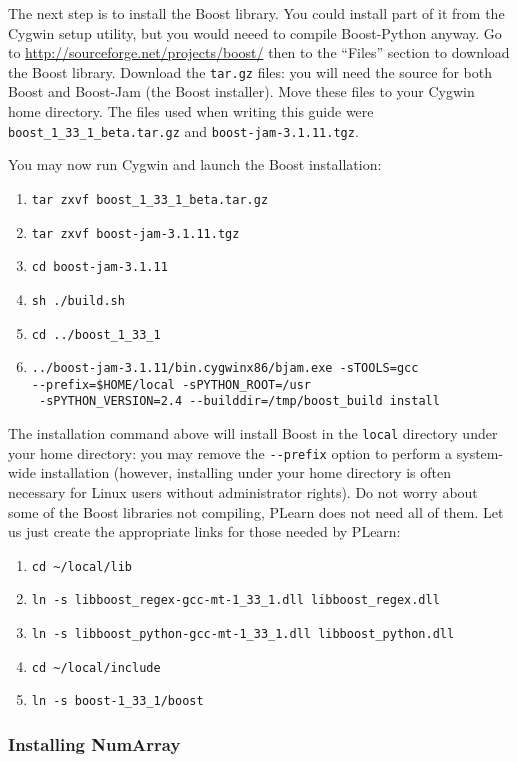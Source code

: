 \documentclass[11pt]{book}
\begin{document}
The next step is to install the Boost library.
You could install part of it from the Cygwin setup utility, but you would
neeed to compile Boost-Python anyway.
Go to \url{http://sourceforge.net/projects/boost/} then to the ``Files'' section
to download
the Boost library. Download the \verb!tar.gz! files:
you will need the source for both Boost and Boost-Jam (the Boost installer).
Move these files to your Cygwin home directory.
The files used when writing this guide were \verb!boost_1_33_1_beta.tar.gz!
and \verb!boost-jam-3.1.11.tgz!.

You may now run Cygwin and launch the Boost installation:
\begin{enumerate}
\item \verb!tar zxvf boost_1_33_1_beta.tar.gz!
\item \verb!tar zxvf boost-jam-3.1.11.tgz!
\item \verb!cd boost-jam-3.1.11!
\item \verb!sh ./build.sh!
\item \verb!cd ../boost_1_33_1!
\item \verb!../boost-jam-3.1.11/bin.cygwinx86/bjam.exe -sTOOLS=gcc! \\
\verb!--prefix=$HOME/local -sPYTHON_ROOT=/usr! \\
\verb! -sPYTHON_VERSION=2.4 --builddir=/tmp/boost_build install!
\end{enumerate}

The installation command above will install Boost in the \verb!local! directory
under your home directory: you may remove the \verb!--prefix! option to perform
a system-wide installation (however, installing under your home directory is often
necessary for Linux users without administrator rights).
Do not worry about some of the Boost libraries not compiling, PLearn does not
need all of them.
Let us just create the appropriate links for those needed by PLearn:
\begin{enumerate}
\item \verb!cd ~/local/lib!
\item \verb!ln -s libboost_regex-gcc-mt-1_33_1.dll libboost_regex.dll!
\item \verb!ln -s libboost_python-gcc-mt-1_33_1.dll libboost_python.dll!
\item \verb!cd ~/local/include!
\item \verb!ln -s boost-1_33_1/boost!
\end{enumerate}

\subsubsection{Installing NumArray}
\end{document}
